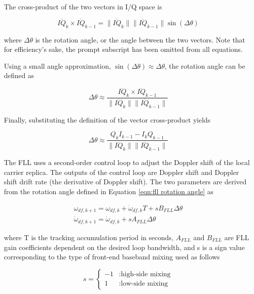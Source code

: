 \documentclass[12pt]{article}
\begin{document}
The cross-product of the two vectors in I/Q space is

\begin{equation*}
\overline{IQ}_{k} \times \overline{IQ}_{k-1} = \lVert \overline{IQ}_{k} \rVert \lVert \overline{IQ}_{k-1} \rVert \sin(\Delta \theta)
\end{equation*}

where $\Delta \theta$ is the rotation angle, or the angle between the two vectors. Note that for efficiency's sake, the prompt subscript has been omitted from all equations.

Using a small angle approximation, $\sin(\Delta \theta) \approx \Delta \theta$, the rotation angle can be defined as

\begin{equation*}
\Delta \theta \approx \frac{\overline{IQ}_{k} \times \overline{IQ}_{k-1}}{\lVert \overline{IQ}_{k} \rVert \lVert \overline{IQ}_{k-1} \rVert}
\end{equation*}

Finally, substituting the definition of the vector cross-product yields

\begin{equation}
\label{eqn:fll rotation angle}
\Delta \theta \approx \frac{Q_{k}I_{k-1}-I_{k}Q_{k-1}}{\lVert \overline{IQ}_{k} \rVert \lVert \overline{IQ}_{k-1} \rVert}
\end{equation}

The FLL uses a second-order control loop to adjust the Doppler shift of the local carrier replica. The outputs of the control loop are Doppler shift and Doppler shift drift rate (the derivative of Doppler shift). The two parameters are derived from the rotation angle defined in Equation \ref{eqn:fll rotation angle} as

\begin{gather}
\label{eqn:w_df}
\omega_{df,k+1}=\omega_{df,k}+\dot{\omega}_{df,k}T+s B_{FLL}\Delta\theta \\
\label{eqn:w_df_dot}
\dot{\omega}_{df,k+1}=\dot{\omega}_{df,k}+s A_{FLL}\Delta\theta
\end{gather}

where T is the tracking accumulation period in seconds, $A_{FLL}$ and $B_{FLL}$ are FLL gain coefficients dependent on the desired loop bandwidth, and s is a sign value corresponding to the type of front-end baseband mixing used as follows

\begin{equation*}
s=\begin{cases} -1 & : \text{high-side mixing} \\
                               1 & : \text{low-side mixing} \end{cases}
\end{equation*}
\end{document}
